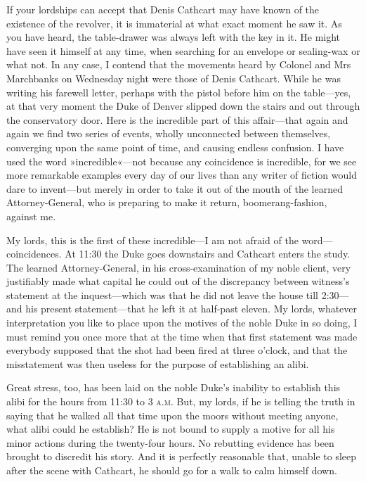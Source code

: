 \begin{dialogue}
 If your lordships can accept that Denis Cathcart may have known of the existence of the revolver, it is immaterial at what exact moment he saw it. As you have heard, the table-drawer was always left with the key in it. He might have seen it himself at any time, when searching for an envelope or sealing-wax or what not. In any case, I contend that the movements heard by Colonel and Mrs Marchbanks on Wednesday night were those of Denis Cathcart. While he was writing his farewell letter, perhaps with the pistol before him on the table—yes, at that very moment the Duke of Denver slipped down the stairs and out through the conservatory door. Here is the incredible part of this affair—that again and again we find two series of events, wholly unconnected between themselves, converging upon the same point of time, and causing endless confusion. I have used the word »incredible«—not because any coincidence is incredible, for we see more remarkable examples every day of our lives than any writer of fiction would dare to invent—but merely in order to take it out of the mouth of the learned Attorney-General, who is preparing to make it return, boomerang-fashion, against me. 

\smallskip 

My lords, this is the first of these incredible—I am not afraid of the word—coincidences. At 11:30 the Duke goes downstairs and Cathcart enters the study. The learned Attorney-General, in his cross-examination of my noble client, very justifiably made what capital he could out of the discrepancy between witness's statement at the inquest—which was that he did not leave the house till 2:30—and his present statement—that he left it at half-past eleven. My lords, whatever interpretation you like to place upon the motives of the noble Duke in so doing, I must remind you once more that at the time when that first statement was made everybody supposed that the shot had been fired at three o'clock, and that the misstatement was then useless for the purpose of establishing an alibi.

\smallskip

Great stress, too, has been laid on the noble Duke's inability to establish this alibi for the hours from 11:30 to 3 \textsc{a.m.} But, my lords, if he is telling the truth in saying that he walked all that time upon the moors without meeting anyone, what alibi could he establish? He is not bound to supply a motive for all his minor actions during the twenty-four hours. No rebutting evidence has been brought to discredit his story. And it is perfectly reasonable that, unable to sleep after the scene with Cathcart, he should go for a walk to calm himself down.


\end{dialogue}
